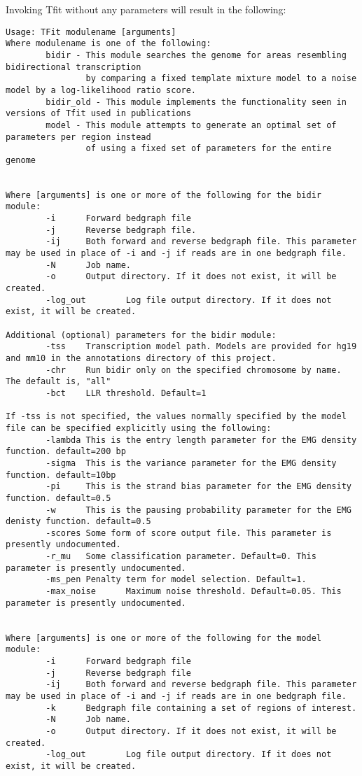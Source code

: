 \documentclass[12pt,letterpaper]{article}
\begin{document}
Invoking Tfit without any parameters will result in the following:
\begin{verbatim}
Usage: TFit modulename [arguments]
Where modulename is one of the following:
        bidir - This module searches the genome for areas resembling bidirectional transcription
                by comparing a fixed template mixture model to a noise model by a log-likelihood ratio score.
        bidir_old - This module implements the functionality seen in versions of Tfit used in publications
        model - This module attempts to generate an optimal set of parameters per region instead 
                of using a fixed set of parameters for the entire genome


Where [arguments] is one or more of the following for the bidir module:
        -i      Forward bedgraph file
        -j      Reverse bedgraph file.
        -ij     Both forward and reverse bedgraph file. This parameter may be used in place of -i and -j if reads are in one bedgraph file.
        -N      Job name.
        -o      Output directory. If it does not exist, it will be created.
        -log_out        Log file output directory. If it does not exist, it will be created.

Additional (optional) parameters for the bidir module:
        -tss    Transcription model path. Models are provided for hg19 and mm10 in the annotations directory of this project.
        -chr    Run bidir only on the specified chromosome by name. The default is, "all"
        -bct    LLR threshold. Default=1

If -tss is not specified, the values normally specified by the model file can be specified explicitly using the following:
        -lambda This is the entry length parameter for the EMG density function. default=200 bp
        -sigma  This is the variance parameter for the EMG density function. default=10bp
        -pi     This is the strand bias parameter for the EMG density function. default=0.5
        -w      This is the pausing probability parameter for the EMG denisty function. default=0.5
        -scores Some form of score output file. This parameter is presently undocumented.
        -r_mu   Some classification parameter. Default=0. This parameter is presently undocumented.
        -ms_pen Penalty term for model selection. Default=1.
        -max_noise      Maximum noise threshold. Default=0.05. This parameter is presently undocumented.


Where [arguments] is one or more of the following for the model module:
        -i      Forward bedgraph file
        -j      Reverse bedgraph file
        -ij     Both forward and reverse bedgraph file. This parameter may be used in place of -i and -j if reads are in one bedgraph file.
        -k      Bedgraph file containing a set of regions of interest.
        -N      Job name.
        -o      Output directory. If it does not exist, it will be created.
        -log_out        Log file output directory. If it does not exist, it will be created.


\end{verbatim}
\end{document}
